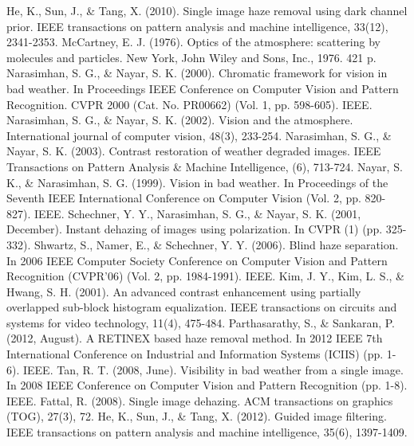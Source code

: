 \documentclass[a4paper, 12pt, oneside]{report}
\begin{document}
\begin{thebibliography}{99}  
\fontsize{10.5}{10.5} \selectfont

\setlength{\itemsep}{0pt}
 He, K., Sun, J., \& Tang, X. (2010). Single image haze removal using dark channel prior. IEEE transactions on pattern analysis and machine intelligence, 33(12), 2341-2353.
 McCartney, E. J. (1976). Optics of the atmosphere: scattering by molecules and particles. New York, John Wiley and Sons, Inc., 1976. 421 p.
 Narasimhan, S. G., \& Nayar, S. K. (2000). Chromatic framework for vision in bad weather. In Proceedings IEEE Conference on Computer Vision and Pattern Recognition. CVPR 2000 (Cat. No. PR00662) (Vol. 1, pp. 598-605). IEEE.
 Narasimhan, S. G., \& Nayar, S. K. (2002). Vision and the atmosphere. International journal of computer vision, 48(3), 233-254.
 Narasimhan, S. G., \& Nayar, S. K. (2003). Contrast restoration of weather degraded images. IEEE Transactions on Pattern Analysis \& Machine Intelligence, (6), 713-724.
 Nayar, S. K., \& Narasimhan, S. G. (1999). Vision in bad weather. In Proceedings of the Seventh IEEE International Conference on Computer Vision (Vol. 2, pp. 820-827). IEEE.
 Schechner, Y. Y., Narasimhan, S. G., \& Nayar, S. K. (2001, December). Instant dehazing of images using polarization. In CVPR (1) (pp. 325-332).
 Shwartz, S., Namer, E., \& Schechner, Y. Y. (2006). Blind haze separation. In 2006 IEEE Computer Society Conference on Computer Vision and Pattern Recognition (CVPR'06) (Vol. 2, pp. 1984-1991). IEEE.
 Kim, J. Y., Kim, L. S., \& Hwang, S. H. (2001). An advanced contrast enhancement using partially overlapped sub-block histogram equalization. IEEE transactions on circuits and systems for video technology, 11(4), 475-484.
 Parthasarathy, S., \& Sankaran, P. (2012, August). A RETINEX based haze removal method. In 2012 IEEE 7th International Conference on Industrial and Information Systems (ICIIS) (pp. 1-6). IEEE.
 Tan, R. T. (2008, June). Visibility in bad weather from a single image. In 2008 IEEE Conference on Computer Vision and Pattern Recognition (pp. 1-8). IEEE.
 Fattal, R. (2008). Single image dehazing. ACM transactions on graphics (TOG), 27(3), 72.
 He, K., Sun, J., \& Tang, X. (2012). Guided image filtering. IEEE transactions on pattern analysis and machine intelligence, 35(6), 1397-1409.

\end{thebibliography}
\end{document}
